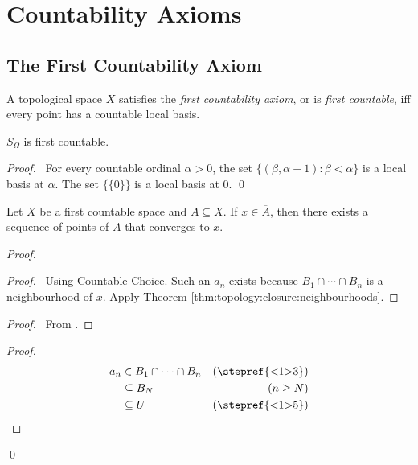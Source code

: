 \chapter{Countability Axioms}

\section{The First Countability Axiom}

\begin{df}
  A topological space $X$ satisfies the \emph{first countability axiom}, or
  is \emph{first countable}, iff every point has a countable local basis.
\end{df}

 \begin{prop}
$S_\Omega$ is first countable.
\end{prop}

\begin{proof}
 \pf\ For every countable ordinal $\alpha > 0$, the set $\{ (\beta, \alpha +
 1) :    \beta < \alpha \}$ is a local basis at $\alpha$. The set $\{ \{ 0
 \} \}$ is a local basis at 0. \qed
\end{proof}

\begin{thm}
  Let $X$ be a first countable space and $A \subseteq X$. If $x \in
  \overline{A}$, then there exists a sequence of points of $A$ that converges
  to $x$.
\end{thm}

\begin{proof}
  \pf
  \begin{proof}
    \pf\ Using Countable Choice. Such an $a_n$ exists because $B_1 \cap
    \cdots
    \cap B_n$ is a neighbourhood of $x$. Apply Theorem
    \ref{thm:topology:closure:neighbourhoods}.
  \end{proof}
  \begin{proof}
    \pf\ From .
  \end{proof}
  \begin{proof}
    \pf
    \begin{align*}
      a_n & \in B_1 \cap \cdots \cap B_n & (\text{\stepref{<1>3}}) \\
      & \subseteq B_N & (n \geq N) \\
      & \subseteq U & (\text{\stepref{<1>5}})
    \end{align*}
  \end{proof}
  \qed
\end{proof}

